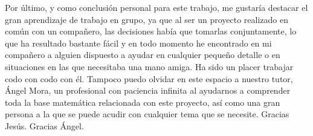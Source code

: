 Por \'ultimo, y como conclusi\'on personal para este trabajo, me gustar\'ia destacar el gran aprendizaje de trabajo en grupo, ya que al ser 
un proyecto realizado en com\'un con un compa\~nero, las decisiones hab\'ia que tomarlas conjuntamente, lo que ha resultado bastante f\'acil y 
en todo momento he encontrado en mi compa\~nero a alguien dispuesto a ayudar en cualquier peque\~no detalle o en situaciones en las que 
necesitaba una mano amiga. Ha sido un placer trabajar codo con codo con \'el. Tampoco puedo olvidar en este espacio a nuestro tutor, \'Angel Mora, 
un profesional con paciencia infinita al ayudarnos a comprender toda la base matem\'atica relacionada con este proyecto, as\'i 
como una gran persona a la que se puede acudir con cualquier tema que se necesite. Gracias Jes\'us. Gracias \'Angel.
